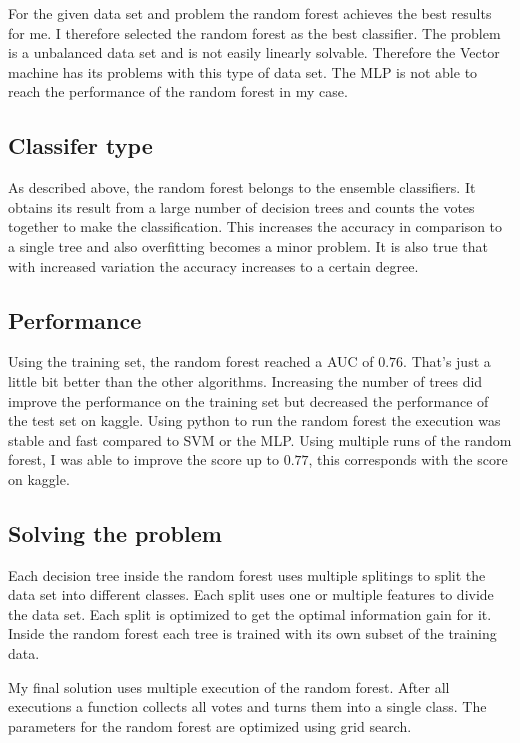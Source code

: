 For the given data set and problem the random forest achieves the best results for me. I therefore selected the random forest as the best classifier. The problem is a unbalanced data set and is not easily linearly solvable. Therefore the Vector machine has its problems with this type of data set. The MLP is not able to reach the performance of the random forest in my case.

\subsection{Classifer type}
As described above, the random forest belongs to the ensemble classifiers. It obtains its result from a large number of decision trees and counts the votes together to make the classification. This increases the accuracy in comparison to a single tree and also overfitting becomes a minor problem. It is also true that with increased variation the accuracy increases to a certain degree.

\subsection{Performance}

Using the training set, the random forest reached a AUC of $0.76$. That's just a little bit better than the other algorithms. Increasing the number of trees did improve the performance on the training set but decreased the performance of the test set on kaggle. Using python to run the random forest the execution was stable and fast compared to SVM or the MLP. Using multiple runs of the random forest, I was able to improve the score up to $0.77$, this corresponds with the score on kaggle.

\subsection{Solving the problem}

Each decision tree inside the random forest uses multiple splitings to split the data set into different classes. Each split uses one or multiple features to divide the data set. Each split is optimized to get the optimal information gain for it. Inside the random forest each tree is trained with its own subset of the training data.

My final solution uses multiple execution of the random forest. After all executions a function collects all votes and turns them into a single class. The parameters for the random forest are optimized using grid search.









